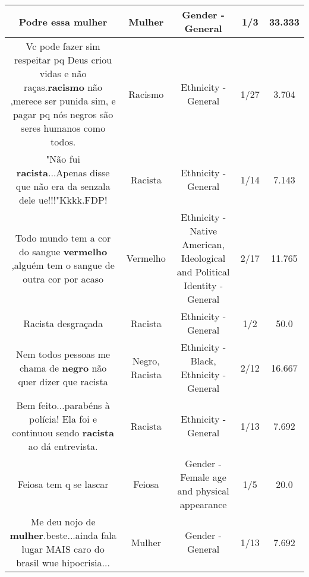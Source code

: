 \documentclass[11pt]{article}
\newlength\mylength
\begin{document}
\begin{center}
\begin{longtable}{|C{.65\mylength}|C{.30\mylength}|C{.12\mylength}|C{.12\mylength}|C{.12\mylength}|}
  \small Podre essa mulher\normalsize   & Mulher & Gender - General & 1/3 & 33.333 \\  \hline
  \small Vc pode fazer sim respeitar pq Deus criou vidas e não raças.\textbf{racismo} não  ,merece ser punida sim, e pagar pq nós negros são seres humanos como todos.\normalsize   & Racismo & Ethnicity - General & 1/27 & 3.704 \\  \hline
  \small "Não fui \textbf{racista}...Apenas disse que não era da senzala dele ue!!!"Kkkk.FDP!\normalsize   & Racista & Ethnicity - General & 1/14 & 7.143 \\  \hline
  \small Todo mundo tem a cor do sangue \textbf{v\textbf{ermelho}} ,alguém tem o sangue de outra cor por acaso\normalsize   & Vermelho & Ethnicity - Native American, Ideological and Political Identity - General & 2/17 & 11.765 \\  \hline
  \small Racista desgraçada\normalsize   & Racista & Ethnicity - General & 1/2 & 50.0 \\  \hline
  \small Nem todos pessoas me chama de \textbf{negro} não quer dizer que racista\normalsize   & Negro, Racista & Ethnicity - Black, Ethnicity - General & 2/12 & 16.667 \\  \hline
  \small Bem feito...parabéns à polícia! Ela foi e continuou sendo \textbf{racista} ao dá entrevista.\normalsize   & Racista & Ethnicity - General & 1/13 & 7.692 \\  \hline
  \small Feiosa tem q se lascar\normalsize   & Feiosa & Gender - Female age and physical appearance & 1/5 & 20.0 \\  \hline
  \small Me deu nojo de \textbf{mulher}.beste...ainda fala lugar MAIS  caro do brasil  wue hipocrisia...\normalsize   & Mulher & Gender - General & 1/13 & 7.692 \\  \hline

\end{longtable}
\end{center}
\end{document}
